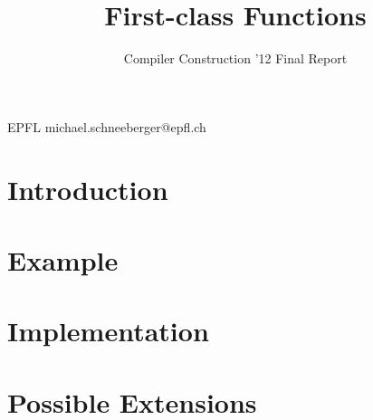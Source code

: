 \documentclass[nocopyrightspace,11pt,authoryear,preprint]{sigplanconf}
\begin{document}


\title{First-class Functions}
\subtitle{Compiler Construction '12 Final Report}

           {EPFL}
           {michael.schneeberger@epfl.ch}

\maketitle

\section{Introduction}


\section{Example}


\section{Implementation}


\section{Possible Extensions}

\end{document}
